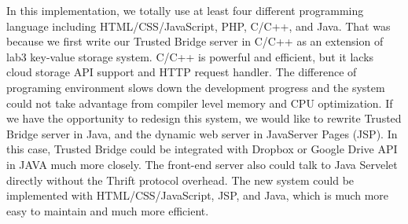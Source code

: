In this implementation, we totally use at least four different programming language including HTML/CSS/JavaScript, PHP, C/C++, and Java. That was because we first write our Trusted Bridge server in C/C++ as an extension of lab3 key-value storage system. C/C++ is powerful and efficient, but it lacks cloud storage API support and HTTP request handler. The difference of programing environment slows down the development progress and the system could not take advantage from compiler level memory and CPU optimization. If we have the opportunity to redesign this system, we would like to rewrite Trusted Bridge server in Java, and the dynamic web server in JavaServer Pages (JSP). In this case, Trusted Bridge could be integrated with Dropbox or Google Drive API in JAVA much more closely. The front-end server also could talk to Java Servelet directly without the Thrift protocol overhead. The new system could be implemented with HTML/CSS/JavaScript, JSP, and Java, which is much more easy to maintain and much more efficient. 